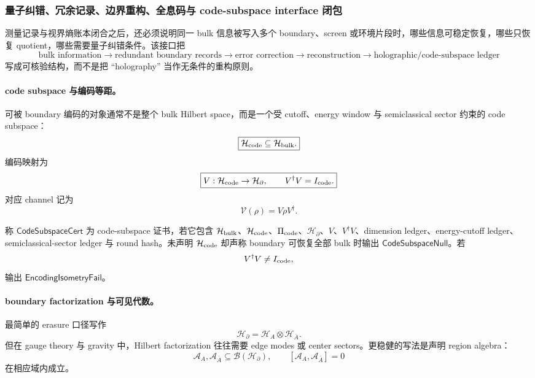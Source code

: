 \subsubsection{量子纠错、冗余记录、边界重构、全息码与 code-subspace interface 闭包}\label{subsubsec:typed-address-biaxial-completion-quantum-error-correction-holographic-code-interface-closure}
测量记录与视界熵账本闭合之后，还必须说明同一 bulk 信息被写入多个 boundary、screen 或环境片段时，哪些信息可稳定恢复，哪些只恢复 quotient，哪些需要量子纠错条件。该接口把
\[
\boxed{
\text{bulk information}
\longrightarrow
\text{redundant boundary records}
\longrightarrow
\text{error correction}
\longrightarrow
\text{reconstruction}
\longrightarrow
\text{holographic/code-subspace ledger}
}
\]
写成可核验结构，而不是把 ``holography'' 当作无条件的重构原则。

\paragraph{code subspace 与编码等距。}
可被 boundary 编码的对象通常不是整个 bulk Hilbert space，而是一个受 cutoff、energy window 与 semiclassical sector 约束的 code subspace：
\[
\boxed{
\mathcal H_{\rm code}\subseteq \mathcal H_{\rm bulk}.
}
\]
编码映射为
\[
\boxed{
V:\mathcal H_{\rm code}\to\mathcal H_{\partial},
\qquad
V^\dagger V=I_{\rm code}.
}
\]
对应 channel 记为
\[
\mathcal V(\rho)=V\rho V^\dagger .
\]

\begin{definition}\label{def:typed-address-biaxial-completion-qec-code-subspace-cert}
称 \(\mathsf{CodeSubspaceCert}\) 为 code-subspace 证书，若它包含 \(\mathcal H_{\rm bulk}\)、\(\mathcal H_{\rm code}\)、\(\Pi_{\rm code}\)、\(\mathcal H_{\partial}\)、\(V\)、\(V^\dagger V\)、dimension ledger、energy-cutoff ledger、semiclassical-sector ledger 与 round hash。未声明 \(\mathcal H_{\rm code}\) 却声称 boundary 可恢复全部 bulk 时输出 \(\mathsf{CodeSubspaceNull}\)。若
\[
V^\dagger V\ne I_{\rm code},
\]
输出 \(\mathsf{EncodingIsometryFail}\)。
\end{definition}

\paragraph{boundary factorization 与可见代数。}
最简单的 erasure 口径写作
\[
\mathcal H_{\partial}=\mathcal H_A\otimes\mathcal H_{\bar A}.
\]
但在 gauge theory 与 gravity 中，Hilbert factorization 往往需要 edge modes 或 center sectors。更稳健的写法是声明 region algebra：
\[
\boxed{
\mathcal A_A,\mathcal A_{\bar A}\subseteq \mathcal B(\mathcal H_\partial),
\qquad
[\mathcal A_A,\mathcal A_{\bar A}]=0
}
\]
在相应域内成立。

